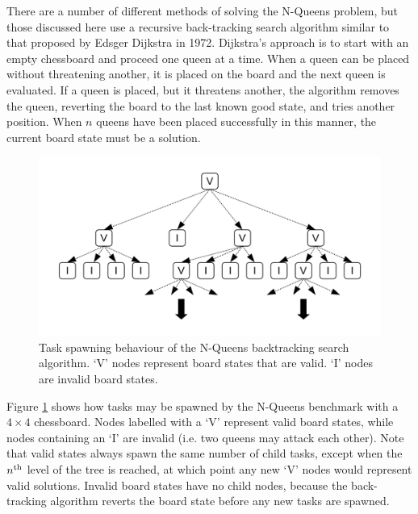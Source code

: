 \documentclass{report}
\begin{document}
There are a number of different methods of solving the N-Queens problem, but those discussed here use a recursive back-tracking search algorithm similar to that proposed by Edsger Dijkstra in 1972\cite{Dahl72}. Dijkstra's approach is to start with an empty chessboard and proceed one queen at a time. When a queen can be placed without threatening another, it is placed on the board and the next queen is evaluated. If a queen is placed, but it threatens another, the algorithm removes the queen, reverting the board to the last known good state, and tries another position. When \(n\) queens have been placed successfully in this manner, the current board state must be a solution.
\noindent
\begin{figure}[t]
	\includegraphics[width=\linewidth]{../diagrams/nqueens_tasks}
	\caption{Task spawning behaviour of the N-Queens backtracking search algorithm. `V' nodes represent board states that are valid. `I' nodes are invalid board states.}
	\label{Fig:nqueenstasks}
\end{figure}

Figure \ref{Fig:nqueenstasks} shows how tasks may be spawned by the N-Queens benchmark with a \(4 \times 4\) chessboard. Nodes labelled with a `V' represent valid board states, while nodes containing an `I' are invalid (i.e. two queens may attack each other). Note that valid states always spawn the same number of child tasks, except when the \(n\textsuperscript{th}\) level of the tree is reached, at which point any new `V' nodes would represent valid solutions. Invalid board states have no child nodes, because the back-tracking algorithm reverts the board state before any new tasks are spawned.
\end{document}
